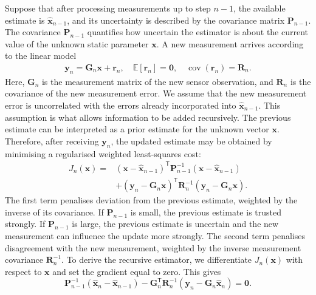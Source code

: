 \documentclass[11pt,oneside,openany]{book}
\begin{document}
Suppose that after processing measurements up to step $n-1$, the available estimate is $\widehat{\mathbf{x}}_{n-1}$, and its uncertainty is described by the covariance matrix $\mathbf{P}_{n-1}$. The covariance $\mathbf{P}_{n-1}$ quantifies how uncertain the estimator is about the current value of the unknown static parameter $\mathbf{x}$. A new measurement arrives according to the linear model
\begin{align*}
\mathbf{y}_n
=
\mathbf{G}_n\mathbf{x}
+
\mathbf{r}_n,
\quad
\mathbb{E}[\mathbf{r}_n]=\mathbf{0},
\quad
\operatorname{cov}(\mathbf{r}_n)=\mathbf{R}_n.
\end{align*}
Here, $\mathbf{G}_n$ is the measurement matrix of the new sensor observation, and $\mathbf{R}_n$ is the covariance of the new measurement error. We assume that the new measurement error is uncorrelated with the errors already incorporated into $\widehat{\mathbf{x}}_{n-1}$. This assumption is what allows information to be added recursively. The previous estimate can be interpreted as a prior estimate for the unknown vector $\mathbf{x}$. Therefore, after receiving $\mathbf{y}_n$, the updated estimate may be obtained by minimising a regularised weighted least-squares cost:
\begin{align}
J_n(\mathbf{x})
=&
\left(
\mathbf{x}
-
\widehat{\mathbf{x}}_{n-1}
\right)^{\mathsf T}
\mathbf{P}_{n-1}^{-1}
\left(
\mathbf{x}
-
\widehat{\mathbf{x}}_{n-1}
\right) \\
&+
\left(
\mathbf{y}_n
-
\mathbf{G}_n\mathbf{x}
\right)^{\mathsf T}
\mathbf{R}_n^{-1}
\left(
\mathbf{y}_n
-
\mathbf{G}_n\mathbf{x}
\right). \nonumber
\end{align}
The first term penalises deviation from the previous estimate, weighted by the inverse of its covariance. If $\mathbf{P}_{n-1}$ is small, the previous estimate is trusted strongly. If $\mathbf{P}_{n-1}$ is large, the previous estimate is uncertain and the new measurement can influence the update more strongly. The second term penalises disagreement with the new measurement, weighted by the inverse measurement covariance $\mathbf{R}_n^{-1}$. To derive the recursive estimator, we differentiate $J_n(\mathbf{x})$ with respect to $\mathbf{x}$ and set the gradient equal to zero. This gives
\begin{equation}
\mathbf{P}_{n-1}^{-1}
\left(
\widehat{\mathbf{x}}_n
-
\widehat{\mathbf{x}}_{n-1}
\right)
-
\mathbf{G}_n^{\mathsf T}
\mathbf{R}_n^{-1}
\left(
\mathbf{y}_n
-
\mathbf{G}_n
\widehat{\mathbf{x}}_n
\right)
=
\mathbf{0}.
\end{equation}
\end{document}
